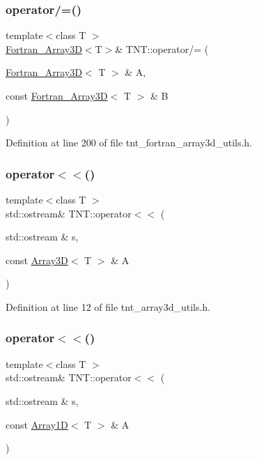 \subsubsection{\texorpdfstring{operator/=()}{operator/=()}\hspace{0.1cm}{\footnotesize\ttfamily [5/5]}}
{\footnotesize\ttfamily template$<$class T $>$ \\
\hyperlink{classTNT_1_1Fortran__Array3D}{Fortran\+\_\+\+Array3D}$<$T$>$\& T\+N\+T\+::operator/= (\begin{DoxyParamCaption}\item[{\hyperlink{classTNT_1_1Fortran__Array3D}{Fortran\+\_\+\+Array3D}$<$ T $>$ \&}]{A,  }\item[{const \hyperlink{classTNT_1_1Fortran__Array3D}{Fortran\+\_\+\+Array3D}$<$ T $>$ \&}]{B }\end{DoxyParamCaption})}



Definition at line 200 of file tnt\+\_\+fortran\+\_\+array3d\+\_\+utils.\+h.

\mbox{\label{namespaceTNT_aeeeff56627c80d662927afc43a148d90}} 
\subsubsection{\texorpdfstring{operator$<$$<$()}{operator<<()}\hspace{0.1cm}{\footnotesize\ttfamily [1/7]}}
{\footnotesize\ttfamily template$<$class T $>$ \\
std\+::ostream\& T\+N\+T\+::operator$<$$<$ (\begin{DoxyParamCaption}\item[{std\+::ostream \&}]{s,  }\item[{const \hyperlink{classTNT_1_1Array3D}{Array3D}$<$ T $>$ \&}]{A }\end{DoxyParamCaption})}



Definition at line 12 of file tnt\+\_\+array3d\+\_\+utils.\+h.

\mbox{\label{namespaceTNT_ac0bffe1c89cc792a28f37d17afc2ce67}} 
\subsubsection{\texorpdfstring{operator$<$$<$()}{operator<<()}\hspace{0.1cm}{\footnotesize\ttfamily [2/7]}}
{\footnotesize\ttfamily template$<$class T $>$ \\
std\+::ostream\& T\+N\+T\+::operator$<$$<$ (\begin{DoxyParamCaption}\item[{std\+::ostream \&}]{s,  }\item[{const \hyperlink{classTNT_1_1Array1D}{Array1D}$<$ T $>$ \&}]{A }\end{DoxyParamCaption})}



